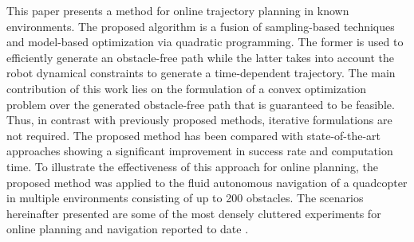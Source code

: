 \documentclass[11pt,epsf,times]{article}
\begin{document}
This paper presents a method for online trajectory planning in known environments. The proposed algorithm is a fusion of sampling-based techniques and model-based optimization via quadratic programming. The former is used to efficiently generate an obstacle-free path while the latter takes into account the robot dynamical constraints to generate a time-dependent trajectory. The main contribution of this work lies on the formulation of a convex optimization problem over the generated obstacle-free path that is guaranteed to be feasible. Thus, in contrast with previously proposed methods, iterative formulations are not required. The proposed method has been compared with state-of-the-art approaches showing a significant improvement in success rate and computation time. To illustrate the effectiveness of this approach for online planning, the proposed method was applied to the fluid autonomous navigation of a quadcopter in multiple environments consisting of up to 200 obstacles. The scenarios hereinafter presented are some of the most densely cluttered experiments for online planning and navigation reported to date \cite{HybridCampos2017}.\\



\end{document}
